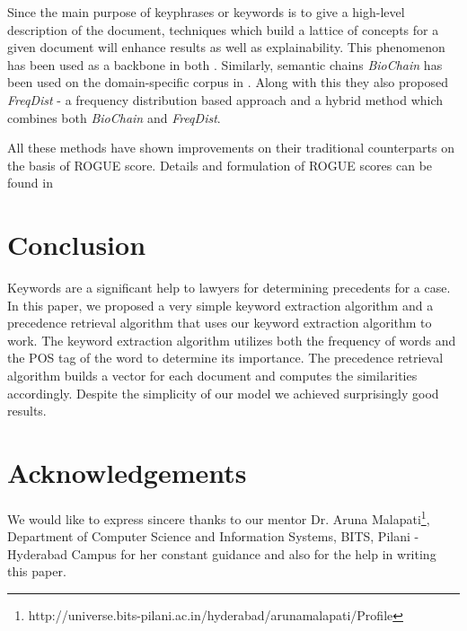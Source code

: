 Since the main purpose of keyphrases or keywords is to give a high-level description of the document, techniques which build a lattice of concepts for a given document will enhance results as well as explainability. This phenomenon has been used as a backbone in both \cite{ye2007document}. Similarly, semantic chains \textit{BioChain} has been used on the domain-specific corpus in \cite{reeve2007use}. Along with this they also proposed \textit{FreqDist} - a frequency distribution based approach and a hybrid method which combines both \textit{BioChain} and \textit{FreqDist}.\par
All these methods have shown improvements on their traditional counterparts on the basis of ROGUE score. Details and formulation of ROGUE scores can be found in \cite{lin2004rouge}
\section{Conclusion}
Keywords are a significant help to lawyers for determining precedents for a case. In this paper, we proposed a very simple keyword extraction algorithm and a precedence retrieval algorithm that uses our keyword extraction algorithm to work. The keyword extraction algorithm utilizes both the frequency of words and the POS tag of the word to determine its importance. The precedence retrieval algorithm builds a vector for each document and computes the similarities accordingly. Despite the simplicity of our model we achieved surprisingly good results. 
\section{Acknowledgements}
We would like to express sincere thanks to our mentor Dr. Aruna Malapati\footnote{http://universe.bits-pilani.ac.in/hyderabad/arunamalapati/Profile}, Department of Computer Science and Information Systems, BITS, Pilani - Hyderabad Campus for her constant guidance and also for the help in writing this paper. 